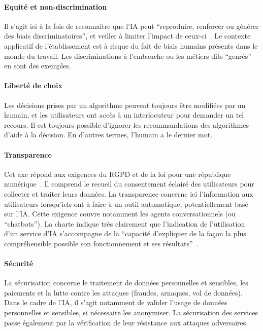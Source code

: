 \paragraph{Equité et non-discrimination}
Il s'agit ici à la fois de reconnaitre que l'IA peut ``reproduire, renforcer ou générer des biais discriminatoires'', et veiller à limiter l'impact de ceux-ci~\cite{Pole2022}. Le contexte applicatif de l'établissement est à risque du fait de biais humains présents dans le monde du travail. Les discriminations à l'embauche ou les métiers dits ``genrés'' en sont des exemples.

\paragraph{Liberté de choix}
Les décisions prises par un algorithme peuvent toujours être modifiées par un humain, et les utilisateurs ont accès à un interlocuteur pour demander un tel recours. Il est toujours possible d'ignorer les recommandations des algorithmes d'aide à la décision. En d'autres termes, l'humain a le dernier mot.

\paragraph{Transparence}
Cet axe répond aux exigences du RGPD et de la loi pour une république numérique~\cite{Legifrance2016}.
Il comprend le recueil du consentement éclairé des utilisateurs pour collecter et traiter leurs données.
La transparence concerne ici l'information aux utilisateurs lorsqu'iels ont à faire à un outil automatique, potentiellement basé sur l'IA. Cette exigence couvre notamment les agents conversationnels (ou ``chatbots'').
La charte indique très clairement que l'indication de l'utilisation d'un service d'IA s'accompagne de la ``capacité d'expliquer de la façon la plus compréhensible possible son fonctionnement et ses résultats''~\cite{Pole2022}.

\paragraph{Sécurité}
La sécurisation concerne le traitement de données personnelles et sensibles, les paiements et la lutte contre les attaques (fraudes, arnaques, vol de données). Dans le cadre de l'IA, il s'agit notamment de valider l'usage de données personnelles et sensibles, si nécessaire les anonymiser. La sécurisation des services passe également par la vérification de leur résistance aux attaques adversaires. %

